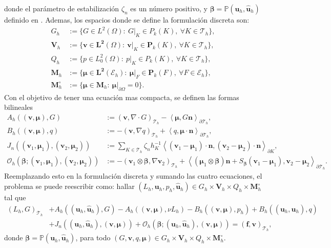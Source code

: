 \documentclass[10pt,a4paper]{report}
\newcommand{\bs}{\boldsymbol}
\newcommand{\Th}{\mathscr{T}_{h}}
\providecommand{\PI}[2]{\left\langle #1,#2  \right\rangle}
\providecommand{\Pii}[2]{\left( #1,#2  \right)}
\begin{document}
    donde el parámetro de estabilización $\zeta_{n}$ es un número positivo, y $\bs{\beta} = \mathbb{P}(\bs{u}_{h},\bs{\hat{u}}_{h})$ definido en \cite{CAC2017}. Ademas, los espacios donde se define la formulación discreta son:
    \begin{align*}
    	G_{h} &:= \{ G\in L^{2}\left(\Omega\right): \ G|_{K}\in P_{k}\left(K\right), \ \forall K\in \Th\},\\
    	\bs{V}_{h} &:= \{ \bs{v}\in \bs{L^{2}}\left(\Omega\right): \ \bs{v}|_{K}\in \bs{P}_{k}\left(K\right), \ \forall K\in \Th\},\\
    	Q_{h} &:= \{ p\in L^{2}_{0}\left(\Omega\right): \ p|_{K}\in P_{k}\left(K\right), \ \forall K\in \Th\},\\
    	\bs{M}_{h} &:= \{\bs{\mu}\in \bs{L^{2}}\left(\mathscr{E}_{h}\right):\ \bs{\mu}|_{F}\in \bs{P}_{k}\left(F\right), \ \forall F\in \mathscr{E}_{h}\},\\
    	\bs{M}^{\circ}_{h} &:= \{\bs{\mu}\in \bs{M}_{h}: \ \bs{\mu}|_{\partial\Omega} = 0\}.
    \end{align*}
    Con el objetivo de tener una ecuación mas compacta, se definen las formas bilineales
    \begin{align}\label{eq:FDC}
    	A_{h}\left((\bs{v},\bs{\mu}),G\right) &:= \Pii{\bs{v}}{\nabla\cdot G}_{\Th} - \PI{\bs{\mu}}{G\bs{n}}_{\partial\Th},\\
    	B_{h}\left((\bs{v},\bs{\mu}),q\right) &:= -\Pii{\bs{v}}{\nabla q}_{\Th} + \PI{q}{\bs{\mu}\cdot\bs{n}}_{\partial\Th},\\
    	J_{n}\left((\bs{v}_{1},\bs{\mu}_{1}),(\bs{v}_{2},\bs{\mu}_{2})\right) &:= \sum_{K\in\Th}\zeta_{n}h^{-1}_{K}\PI{(\bs{v}_{1}-\bs{\mu}_{1})\cdot\bs{n}}{(\bs{v}_{2}-\bs{\mu}_{2})\cdot\bs{n}}_{\partial K},\\
    	\mathcal{O}_{h}\left(\bs{\beta};(\bs{v}_{1},\bs{\mu}_{1}),(\bs{v}_{2},\bs{\mu}_{2})\right) &:= -\Pii{\bs{v}_{1}\otimes\bs{\beta}}{\nabla\bs{v}_{2}}_{\Th} + \PI{(\bs{\mu}_{1}\otimes\bs{\beta})\bs{n} + S_{\bs{\beta}}(\bs{v}_{1}-\bs{\mu}_{1})}{\bs{v}_{2}-\bs{\mu}_{2}}_{\partial\Th}.
    \end{align}
    Reemplazando esto en la formulación discreta y sumando las cuatro ecuaciones, el problema se puede reescribir como: hallar $\left(L_{h},\bs{u}_{h},p_{h},\bs{\hat{u}}_{h}\right)\in G_{h}\times\bs{V}_{h}\times Q_{h}\times \bs{M}^{\circ}_{h}$ tal que 
    \begin{align}
    	\Pii{L_{h}}{G}_{\Th} &+ A_{h}\left((\bs{u}_{h},\bs{\hat{u}}_{h}),G\right) - A_{h}\left((\bs{v},\bs{\mu}),\nu L_{h}\right) - 	B_{h}\left((\bs{v},\bs{\mu}),p_{h}\right) + B_{h}\left((\bs{u}_{h},\bs{\hat{u}}_{h}),q\right)\nonumber \\  &+ J_{n}\left((\bs{u}_{h},\bs{\hat{u}}_{h}),(\bs{v},\bs{\mu})\right) + \mathcal{O}_{h}\left(\bs{\beta};(\bs{u}_{h},\bs{\hat{u}}_{h}),(\bs{v},\bs{\mu})\right) = \Pii{\bs{f}}{\bs{v}}_{\Th}, \label{eq:FDHDGC}
    \end{align} 
   donde $\bs{\beta} = \mathbb{P}(\bs{u}_{h},\bs{\hat{u}}_{h})$, para todo $\left(G,\bs{v},q,\bs{\mu}\right)\in G_{h}\times\bs{V}_{h}\times Q_{h}\times \bs{M}^{\circ}_{h}$.
   \newpage
\end{document}
